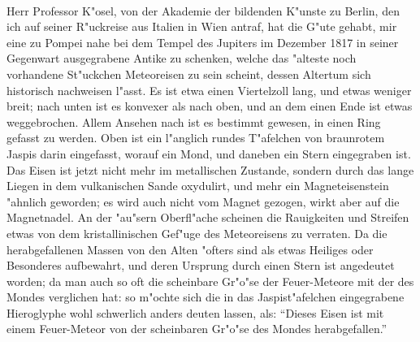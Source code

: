 \documentclass[a4paper, 11pt, oneside, polutonikogreek, german]{article}
\begin{document}
\paragraph{}
Herr Professor K"osel, von der Akademie der bildenden K"unste zu Berlin, den ich auf seiner R"uckreise aus Italien in Wien antraf, hat die G"ute gehabt, mir eine zu Pompei nahe bei dem Tempel des Jupiters im Dezember 1817 in seiner Gegenwart ausgegrabene Antike zu schenken, welche das "alteste noch vorhandene St"uckchen Meteoreisen zu sein scheint, dessen Altertum sich historisch nachweisen l"asst. Es ist etwa einen Viertelzoll lang, und etwas weniger breit; nach unten ist es konvexer als nach oben, und an dem einen Ende ist etwas weggebrochen. Allem Ansehen nach ist es bestimmt gewesen, in einen Ring gefasst zu werden. Oben ist ein l"anglich rundes T"afelchen von braunrotem Jaspis darin eingefasst, worauf ein Mond, und daneben ein Stern eingegraben ist. Das Eisen ist jetzt nicht mehr im metallischen Zustande, sondern durch das lange Liegen in dem vulkanischen Sande oxydulirt, und mehr ein Magneteisenstein "ahnlich geworden; es wird auch nicht vom Magnet gezogen, wirkt aber auf die Magnetnadel. An der "au"sern Oberfl"ache scheinen die Rauigkeiten und Streifen etwas von dem kristallinischen Gef"uge des Meteoreisens zu verraten. Da die herabgefallenen Massen von den Alten "ofters sind als etwas Heiliges oder Besonderes aufbewahrt, und deren Ursprung durch einen Stern ist angedeutet worden; da man auch so oft die scheinbare Gr"o"se der Feuer-Meteore mit der des Mondes verglichen hat: so m"ochte sich die in das Jaspist"afelchen eingegrabene Hieroglyphe wohl schwerlich anders deuten lassen, als: "`Dieses Eisen ist mit einem Feuer-Meteor von der scheinbaren Gr"o"se des Mondes herabgefallen."'
\clearpage
\section{}
\paragraph{}
\subsection{}
\end{document}
